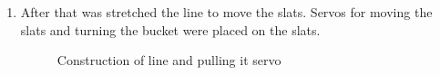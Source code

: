\begin{enumerate}
  \item After that was stretched the line to move the slats. Servos for moving the slats and turning the bucket were placed on the slats.
  \begin{figure}[H]
  	\begin{minipage}[h]{0.47\linewidth}
  		\caption{Construction of line and pulling it servo}
  	\end{minipage}
  	\hfill
  	\begin{minipage}[h]{0.47\linewidth}

\end{minipage}
\end{figure}
\end{enumerate}
